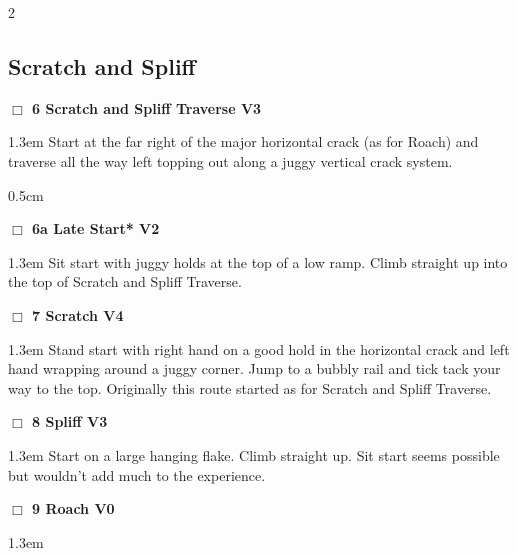 \begin{multicols}{2}
\subsection*{Scratch and Spliff}\label{bf:Scratch and Spliff}
\needspace{2em}
\label{rt:Scratch and Spliff Traverse}
\colorbox{green!20}{
\parbox{0.95\linewidth}{
\hspace{-1ex}\textbf{$\Box$
6 Scratch and Spliff Traverse V3  
}}}
\begin{adjustwidth}{1.3em}{}			
Start at the far right of the major horizontal crack (as for Roach) and traverse all the way left topping out along a juggy vertical crack system.
\end{adjustwidth}
\begin{adjustwidth}{0.5cm}{}				
\needspace{4em}
\needspace{2em}
\label{vr:Late Start}
\colorbox{green!20}{
\parbox{0.95\linewidth}{
\hspace{-1ex}\textbf{$\Box$
6a Late Start* V2  
}}}
\begin{adjustwidth}{1.3em}{}			
Sit start with juggy holds at the top of a low ramp. Climb straight up into the top of Scratch and Spliff Traverse.
\end{adjustwidth}
\end{adjustwidth}
\needspace{2em}
\label{rt:Scratch}
\colorbox{RoyalBlue!20}{
\parbox{0.95\linewidth}{
\hspace{-1ex}\textbf{$\Box$
7 Scratch V4  
}}}
\begin{adjustwidth}{1.3em}{}			
Stand start with right hand on a good hold in the horizontal crack and left hand wrapping around a juggy corner. Jump to a bubbly rail and tick tack your way to the top. Originally this route started as for Scratch and Spliff Traverse.
\end{adjustwidth}
\needspace{2em}
\label{rt:Spliff}
\colorbox{green!20}{
\parbox{0.95\linewidth}{
\hspace{-1ex}\textbf{$\Box$
8 Spliff V3  \warn
}}}
\begin{adjustwidth}{1.3em}{}			
Start on a large hanging flake. Climb straight up. Sit start seems possible but wouldn't add much to the experience.
\end{adjustwidth}
\needspace{2em}
\label{rt:Roach}
\colorbox{green!20}{
\parbox{0.95\linewidth}{
\hspace{-1ex}\textbf{$\Box$
9 Roach V0  
}}}
\begin{adjustwidth}{1.3em}{}			

\end{adjustwidth}
\end{multicols}
